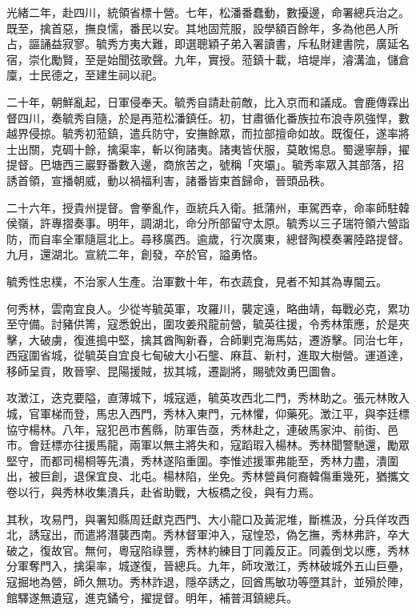 \begin{pinyinscope}
光緒二年，赴四川，統領省標十營。七年，松潘番蠢動，數擾邊，命署總兵治之。既至，擒首惡，撫良懦，番民以安。其地固荒服，設學額百餘年，多為他邑人所占，謳誦益寂寥。毓秀方夷大難，即選聰穎子弟入署讀書，斥私財建書院，廣延名宿，崇化勵賢，至是始聞弦歌聲。九年，實授。蒞鎮十載，培堤岸，濬溝洫，儲倉廩，士民德之，至建生祠以祀。

二十年，朝鮮亂起，日軍侵奉天。毓秀自請赴前敵，比入京而和議成。會鹿傳霖出督四川，奏毓秀自隨，於是再蒞松潘鎮任。初，甘肅循化番族拉布浪寺夙強悍，數越界侵掠。毓秀初蒞鎮，遣兵防守，安撫餘眾，而拉部擅命如故。既復任，遂率將士出關，克碉十餘，擒渠率，斬以徇諸夷。諸夷皆伏服，莫敢惕息。蜀邊寧靜，擢提督。巴塘西三巖野番數入邊，商旅苦之，號稱「夾壩」。毓秀率眾入其部落，招誘首領，宣播朝威，動以禍福利害，諸番皆束首歸命，晉頭品秩。

二十六年，授貴州提督。會拳亂作，亟統兵入衛。抵蒲州，車駕西幸，命率師駐韓侯嶺，許專摺奏事。明年，調湖北，命分所部留守太原。毓秀以三子瑞符領六營詣防，而自率全軍隨扈北上。尋移廣西。逾歲，行次廣東，總督陶模奏署陸路提督。九月，還湖北。宣統二年，創發，卒於官，謚勇恪。

毓秀性忠樸，不治家人生產。治軍數十年，布衣蔬食，見者不知其為專閫云。

何秀林，雲南宜良人。少從岑毓英軍，攻羅川，襲定遠，略曲靖，每戰必克，累功至守備。討豬供箐，寇悉銳出，圍攻姜飛龍前營，毓英往援，令秀林策應，於是夾擊，大破虜，復進搗中堅，擒其酋陶新春，合師剿克海馬姑，遷游擊。同治七年，西寇圍省城，從毓英自宜良七甸破大小石壟、麻苴、新村，進取大樹營。運道達，移師呈貢，敗晉寧、昆陽援賊，拔其城，遷副將，賜號效勇巴圖魯。

攻澂江，迭克要隘，直薄城下，城寇遁，毓英攻西北二門，秀林助之。張元林敗入城，官軍梯而登，馬忠入西門，秀林入東門，元林懼，仰藥死。澂江平，與李廷標協守楊林。八年，寇犯邑市舊縣，防軍告亟，秀林赴之，連破馬家沖、前街、邑市。會廷標亦往援馬龍，兩軍以無主將失和，寇蹈瑕入楊林。秀林聞警馳還，勵眾堅守，而都司楊桐等先潰，秀林遂陷重圍。李惟述援軍弗能至，秀林力盡，潰圍出，被巨創，退保宜良、北屯。楊林陷，坐免。秀林營員何裔韓傷重幾死，猶攜文卷以行，與秀林收集潰兵，赴省助戰，大板橋之役，與有力焉。

其秋，攻易門，與署知縣周廷獻克西門、大小龍口及黃泥堆，斷樵汲，分兵佯攻西北，誘寇出，而遣將潛襲西南。秀林督軍沖入，寇惶恐，偽乞撫，秀林弗許，卒大破之，復故官。無何，粵寇陷祿豐，秀林約練目丁同義反正。同義倒戈以應，秀林分軍奪門入，擒渠率，城遂復，晉總兵。九年，師攻澂江，秀林破城外五山巨壘，寇掘地為營，師久無功。秀林詐退，隱卒誘之，回酋馬敏功等墮其計，並殞於陣，館驛遂無遺寇，進克鐍兮，擢提督。明年，補普洱鎮總兵。


\end{pinyinscope}
